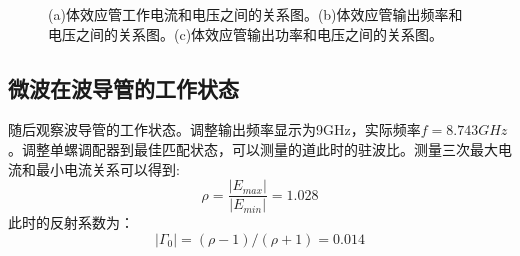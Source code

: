 \documentclass[aps,pre,12pt,preprint,onecolumn,showpacs,showkeys,UTF8]{revtex4-1}
\begin{document}
\begin{figure}[ht]
	\begin{center}

	\end{center}
	\caption{(a)体效应管工作电流和电压之间的关系图。(b)体效应管输出频率和电压之间的关系图。(c)体效应管输出功率和电压之间的关系图。}
	\label{fig:fig2}
\end{figure}

\subsection{微波在波导管的工作状态}

随后观察波导管的工作状态。调整输出频率显示为9GHz，实际频率$f=8.743GHz$。调整单螺调配器到最佳匹配状态，可以测量的道此时的驻波比。测量三次最大电流和最小电流关系可以得到:
\begin{equation}
	\rho = \frac{|E_{max}|}{|E_{min}|} = 1.028
\end{equation}
此时的反射系数为：
\begin{equation}
	|\Gamma_0|=(\rho - 1)/(\rho + 1) = 0.014
\end{equation}
\end{document}
